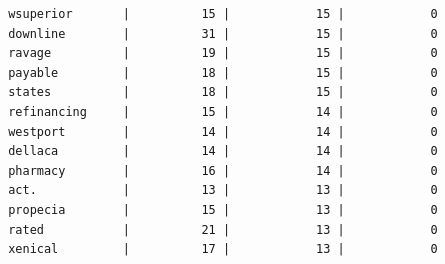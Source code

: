 \documentclass[a4paper,12pt]{article}
\begin{document}
\begin{verbatim}
 wsuperior       |          15 |            15 |            0
 downline        |          31 |            15 |            0
 ravage          |          19 |            15 |            0
 payable         |          18 |            15 |            0
 states          |          18 |            15 |            0
 refinancing     |          15 |            14 |            0
 westport        |          14 |            14 |            0
 dellaca         |          14 |            14 |            0
 pharmacy        |          16 |            14 |            0
 act.            |          13 |            13 |            0
 propecia        |          15 |            13 |            0
 rated           |          21 |            13 |            0
 xenical         |          17 |            13 |            0
	\end{verbatim}
\end{document}
